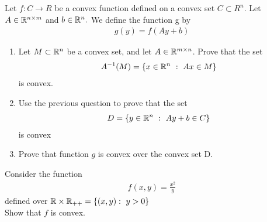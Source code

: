 \documentclass{ExerciseSheet}
\newif\ifsolutions
\begin{document}
\fi

\vskip 0.5cm
\begin{exo}
Let $f : C\to R$ be a convex function defined on a convex set $C\subset R^n$. Let $A \in \mathbb{R}^{n\times m}$ and $b \in \mathbb{R}^n.$ We define the function g  by
    \begin{align*}
        g(y)=f(Ay+b)
    \end{align*}
 \begin{enumerate}
     \item Let $M\subset \mathbb{R}^n$ be a convex set, and let $A\in\mathbb{R}^{m\times n}$. Prove that the set
        \begin{align*}
            A^{-1}(M)= \{x\in\mathbb{R}^n~:~ Ax\in M\}
        \end{align*}
is convex.
    \item Use the previous question to prove that the set 
    \begin{align*}
        D= \{y \in \mathbb{R}^n~:~ Ay+b\in C\}
    \end{align*}
    is convex

  \item Prove that function $g$ is convex over the convex set D.
   \end{enumerate}
\end{exo}


\ifsolutions
\vskip 0.3cm
\begin{solution}%
   proof of Theorem 7.17 in Beck's book [1]
\end{solution}
\fi

\vskip 0.5cm
\begin{exo}
 Consider the function
  \begin{align*}
      f(x,y)=\frac{x^2}{y}
  \end{align*}
 defined over $\mathbb{R}\times \mathbb{R}_{++}=\{(x,y):~y>0\}$\\
 Show that $f$ is convex. 	
\end{exo}

\ifsolutions
\vskip 0.3cm
\begin{solution}
    Example 7.15
\end{solution}
\fi
\end{document}

